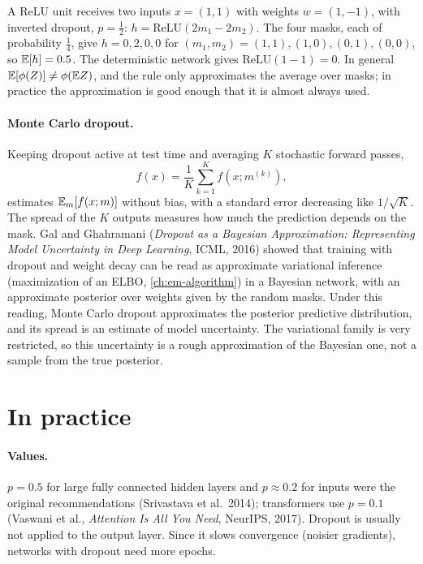 \begin{notechapter}
\begin{example}\label{dropout:ex:counter}
A ReLU unit receives two inputs $x = (1,1)$ with weights $w = (1,-1)$, with inverted dropout, $p = \frac12$:
$h = \mathrm{ReLU}(2m_1 - 2m_2)$. The four masks, each of probability $\frac14$, give $h = 0, 2, 0, 0$ for
$(m_1,m_2) = (1,1), (1,0), (0,1), (0,0)$, so $\mathbb{E}[h] = 0.5$. The deterministic network gives $\mathrm{ReLU}(1 - 1) = 0$. In
general $\mathbb{E}[\phi(Z)]\neq\phi(\mathbb{E} Z)$, and the rule only approximates the average over masks; in practice the
approximation is good enough that it is almost always used.
\end{example}

\paragraph{Monte Carlo dropout.} Keeping dropout active at test time and averaging $K$
stochastic forward passes,
\[
  \hat f(x) = \frac1K\sum_{k=1}^Kf(x; m^{(k)}),
\]
estimates $\mathbb{E}_m[f(x; m)]$ without bias, with a standard error decreasing like $1/\sqrt K$. The spread of the
$K$ outputs measures how much the prediction depends on the mask. Gal and Ghahramani
(\emph{Dropout as a Bayesian Approximation: Representing Model Uncertainty in Deep
Learning}, ICML, 2016) showed that training with dropout and weight decay can be read as
approximate variational inference (maximization of an ELBO, \cref{ch:em-algorithm}) in a
Bayesian network,
with an approximate posterior over weights given by the random masks. Under this reading, Monte
Carlo dropout approximates the posterior predictive distribution, and its spread is an
estimate of model uncertainty. The variational family is very restricted, so this
uncertainty is a rough approximation of the Bayesian one, not a sample from the true
posterior.

\section{In practice}\label{dropout:sec:practice}

\paragraph{Values.} $p = 0.5$ for large fully connected hidden layers and $p\approx0.2$ for inputs were the
original recommendations (Srivastava et al.\ 2014); transformers use $p = 0.1$ (Vaswani et al.,
\emph{Attention Is All You Need}, NeurIPS, 2017). Dropout is usually not applied to the
output layer. Since it slows convergence (noisier gradients), networks with dropout need
more epochs.


\end{notechapter}
